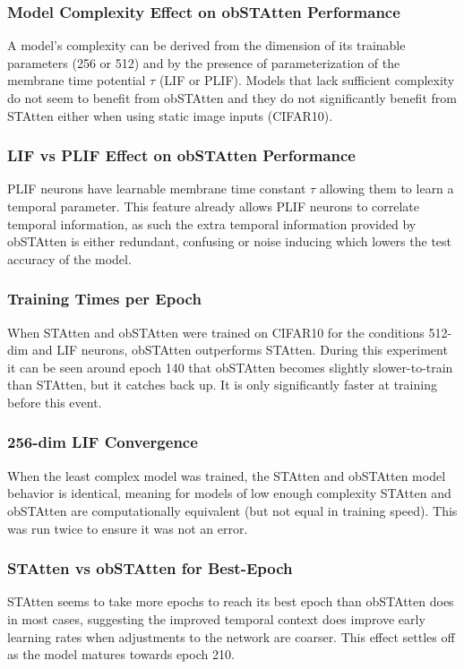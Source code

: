 \documentclass[../main.tex]{subfiles}
\begin{document}
\subsubsection{Model Complexity Effect on obSTAtten Performance}
A model's complexity can be derived from the dimension of its trainable parameters (256 or 512) and by the presence of parameterization of the membrane time potential $\tau$ (LIF or PLIF). Models that lack sufficient complexity do not seem to benefit from obSTAtten and they do not significantly benefit from STAtten either when using static image inputs (CIFAR10).

\subsubsection{LIF vs PLIF Effect on obSTAtten Performance}
PLIF neurons have learnable membrane time constant $\tau$ allowing them to learn a temporal parameter. This feature already allows PLIF neurons to correlate temporal information, as such the extra temporal information provided by obSTAtten is either redundant, confusing or noise inducing which lowers the test accuracy of the model.

\subsubsection{Training Times per Epoch}
When STAtten and obSTAtten were trained on CIFAR10 for the conditions 512-dim and LIF neurons, obSTAtten outperforms STAtten. During this experiment it can be seen around epoch 140 that obSTAtten becomes slightly slower-to-train than STAtten, but it catches back up. It is only significantly faster at training before this event.

\subsubsection{256-dim LIF Convergence}
When the least complex model was trained, the STAtten and obSTAtten model behavior is identical, meaning for models of low enough complexity STAtten and obSTAtten are computationally equivalent (but not equal in training speed). This was run twice to ensure it was not an error.

\subsubsection{STAtten vs obSTAtten for Best-Epoch}
STAtten seems to take more epochs to reach its best epoch than obSTAtten does in most cases, suggesting the improved temporal context does improve early learning rates when adjustments to the network are coarser. This effect settles off as the model matures towards epoch 210.
\end{document}
